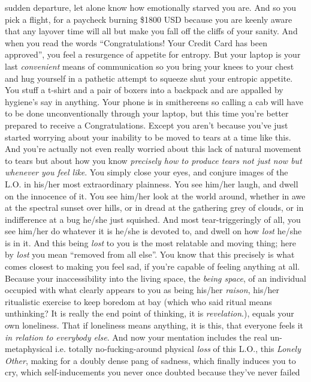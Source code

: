 \documentclass{article}
\begin{document}
sudden departure, let alone know how emotionally starved you are. And so
you pick a flight, for a paycheck burning \$1800 USD because you are
keenly aware that any layover time will all but make you fall off the
cliffs of your sanity. And when you read the words ``Congratulations!
Your Credit Card has been approved'', you feel a resurgence of appetite
for entropy. But your laptop is your last \textit{convenient} means of
communication so you bring your knees to your chest and hug yourself in
a pathetic attempt to squeeze shut your entropic appetite. You stuff
a t-shirt and a pair of boxers into a backpack and are appalled by
hygiene's say in anything. Your phone is in smithereens so calling a cab
will have to be done unconventionally through your laptop, but this time
you're better prepared to receive a Congratulations. Except you aren't
because you've just started worrying about your inability to be moved to
tears at a time like this. And you're actually not even really worried
about this lack of natural movement to tears but about how you know
\textit{precisely how to produce tears not just now but whenever you
feel like}. You simply close your eyes, and conjure images of the L.O.
in his/her most extraordinary plainness. You see him/her laugh, and
dwell on the innocence of it. You see him/her look at the world around,
whether in awe at the spectral sunset over hills, or in dread at the
gathering grey of clouds, or in indifference at a bug he/she just
squished. And most tear-triggeringly of all, you see him/her do whatever
it is he/she is devoted to, and dwell on how \textit{lost} he/she is in
it. And this being \textit{lost} to you is the most relatable and moving
thing; here by \textit{lost} you mean ``removed from all else''. You
know that this precisely is what comes closest to making you feel sad,
if you're capable of feeling anything at all. Because your
inaccessibility into the living space, the \textit{being space}, of an
individual occupied with what clearly appears to you as being his/her
\textit{raison}, his/her ritualistic exercise to keep boredom at bay
(which who said ritual means unthinking? It is really the end point of
thinking, it is \textit{revelation}.), equals your own loneliness. That
if loneliness means anything, it is this, that everyone feels it
\textit{in relation to everybody else}. And now your mentation includes
the real un-metaphysical i.e. totally no-fucking-around physical
\textit{loss} of this L.O., this \textit{Lonely Other}, making for
a doubly dense pang of sadness, which finally induces you to cry, which
self-inducements you never once doubted because they've never failed
\end{document}
